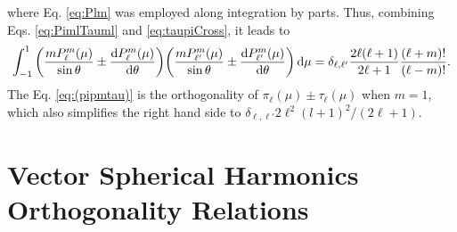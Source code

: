 %
where Eq. \eqref{eq:Plm} was employed along integration by parts. Thus, combining Eqs. \eqref{eq:PimlTauml} and \eqref{eq:taupiCross}, it leads to
%
\begin{align}
\int_{-1}^{1}\qty(\frac{mP_\ell^m(\mu)}{\sin\theta}\pm\dv{P_\ell^m(\mu)}{\theta})\qty(\frac{mP_{\ell'}^m(\mu)}{\sin\theta}\pm\dv{P_{\ell'}^m(\mu)}{\theta})\dd{\mu}  
 =  \delta_{\ell,\ell'}\frac{2\ell(\ell+1)}{2\ell+1}\frac{(\ell+m)!}{(\ell-m)!}.
 \label{eq:(pipmtau)}
\end{align}
%
The Eq. \eqref{eq:(pipmtau)}  is the orthogonality of $\pi_\ell(\mu)\pm\tau_\ell(\mu)$ when $m = 1$, which also simplifies the right hand side to $\delta_{\ell,\ell'} 2\ell^2(l+1)^2/(2\ell+1)$.


\section*{Vector Spherical Harmonics Orthogonality Relations}

